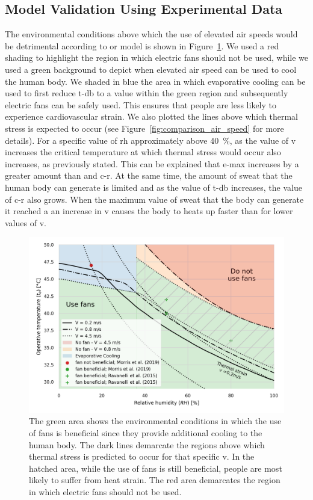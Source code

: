 \subsection{Model Validation Using Experimental Data}\label{subsec:model-validation-experimental-data}

The environmental conditions above which the use of elevated air speeds would be detrimental according to or model is shown in Figure~\ref{fig:use_fans_experimental}.
We used a red shading to highlight the region in which electric fans should not be used, while we used a green background to depict when elevated air speed can be used to cool the human body.
We shaded in blue the area in which evaporative cooling can be used to first reduce \ac{t-db} to a value within the green region and subsequently electric fans can be safely used.
This ensures that people are less likely to experience cardiovascular strain.
We also plotted the lines above which thermal stress is expected to occur (see Figure~\ref{fig:comparison_air_speed} for more details).
For a specific value of \ac{rh} approximately above 40~\%, as the value of \ac{v} increases the critical temperature at which thermal stress would occur also increases, as previously stated.
This can be explained that \ac{e-max} increases by a greater amount than and \ac{c-r}.
At the same time, the amount of sweat that the human body can generate is limited and as the value of \ac{t-db} increases, the value of \ac{c-r} also grows.
When the maximum value of sweat that the body can generate it reached a an increase in \ac{v} causes the body to heats up faster than for lower values of \ac{v}.

\begin{figure}[thb!]
    \centering
    \includegraphics[width=\textwidth]{figures/summary_use_fans_comparison_experimental}
    \caption{The green area shows the environmental conditions in which the use of fans is beneficial since they provide additional cooling to the human body.
    The dark lines demarcate the regions above which thermal stress is predicted to occur for that specific \ac{v}.
    In the hatched area, while the use of fans is still beneficial, people are most likely to suffer from heat strain.
    The red area demarcates the region in which electric fans should not be used.
    }
    \label{fig:use_fans_experimental}
\end{figure}

